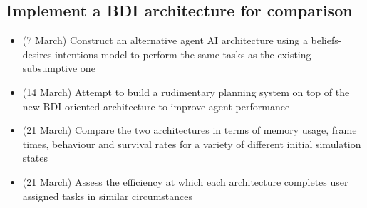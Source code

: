 \documentclass[a4paper,11pt]{article}
\begin{document}
\subsection{Implement a BDI architecture for comparison}
    \begin{itemize}
    \item (7 March) Construct an alternative agent AI architecture using a
        beliefs-desires-intentions model to perform the same tasks as the
        existing subsumptive one
    \item (14 March) Attempt to build a rudimentary planning system on top of
        the new BDI oriented architecture to improve agent performance
    \item (21 March) Compare the two architectures in terms of memory usage,
        frame times, behaviour and survival rates for a variety of different
        initial simulation states
    \item (21 March) Assess the efficiency at which each architecture completes 
        user assigned tasks in similar circumstances
    \end{itemize}
\end{document}
